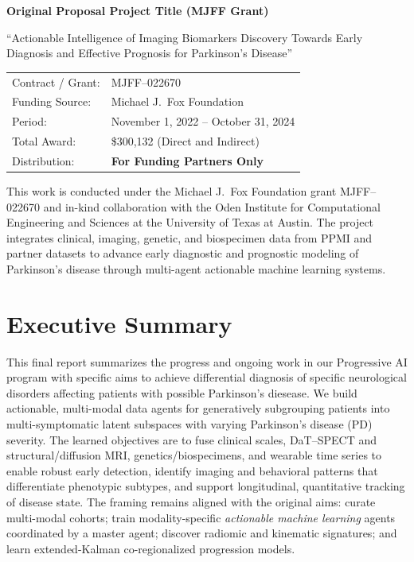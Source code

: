 \documentclass[11pt]{article}
\begin{document}
\begin{titlepage}
    {\Large \textbf{Original Proposal Project Title (MJFF Grant)}}\par
    {\normalsize ``Actionable Intelligence of Imaging Biomarkers Discovery Towards Early Diagnosis and Effective Prognosis for Parkinson’s Disease''}\par
    \vspace{1em}

    \begin{tabular}{@{}ll@{}}
        Contract / Grant: & MJFF--022670 \\
        Funding Source: & Michael J.\ Fox Foundation \\
        Period: & November 1, 2022 -- October 31, 2024 \\
        Total Award: & \$300{,}132 (Direct and Indirect) \\
        Distribution: & \textbf{For Funding Partners Only}
    \end{tabular}
    \vfill

    {\footnotesize
    This work is conducted under the Michael J.\ Fox Foundation grant MJFF--022670 and in-kind 
    collaboration with the Oden Institute for Computational Engineering and Sciences at the University of 
    Texas at Austin. The project integrates clinical, imaging, genetic, and biospecimen data from PPMI 
    and partner datasets to advance early diagnostic and prognostic modeling of Parkinson’s disease 
    through multi-agent actionable machine learning systems.}

\end{titlepage}


\newpage

\section{Executive Summary}
\label{sec:exec-summary}

This final report summarizes the progress and ongoing work in our Progressive AI program with specific aims to achieve
differential diagnosis of  specific neurological disorders affecting patients with possible Parkinson's diesease. We build  actionable, multi-modal data agents for generatively subgrouping patients into multi-symptomatic latent subspaces with varying  Parkinson’s disease (PD)  severity.
The learned objectives are to fuse clinical scales, DaT--SPECT and structural/diffusion MRI, genetics/biospecimens, and wearable time series to enable robust early detection, identify imaging and behavioral patterns that differentiate phenotypic subtypes, and support longitudinal, quantitative tracking of disease state. The framing remains aligned with the original aims: curate multi-modal cohorts; train modality-specific \emph{actionable machine learning} agents coordinated by a master agent; discover radiomic and kinematic signatures; and learn extended-Kalman co-regionalized progression models.
\end{document}
